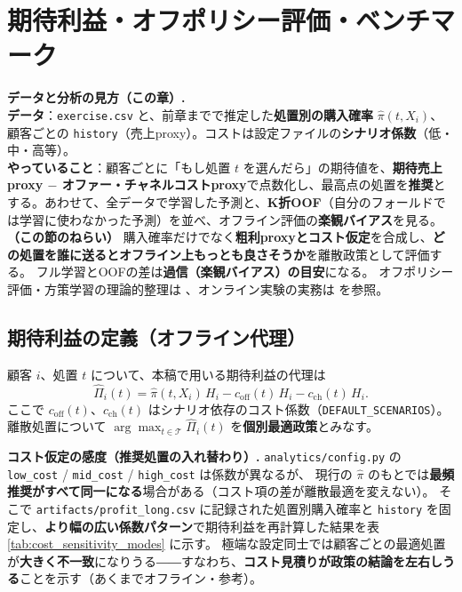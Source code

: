 \documentclass[11pt,a4paper]{article}
\newcommand{\pihat}{\hat{\pi}}
\newcommand{\Pihat}{\widehat{\Pi}}
\begin{document}
\FloatBarrier
\section{期待利益・オフポリシー評価・ベンチマーク}
\label{sec:opeval}

\noindent\textbf{データと分析の見方（この章）.}\\
\textbf{データ}：\texttt{exercise.csv} と、前章までで推定した\textbf{処置別の購入確率} $\pihat(t,X_i)$、顧客ごとの \texttt{history}（売上proxy）。コストは設定ファイルの\textbf{シナリオ係数}（低・中・高等）。\\
\textbf{やっていること}：顧客ごとに「もし処置 $t$ を選んだら」の期待値を、\textbf{期待売上proxy $-$ オファー・チャネルコストproxy}で点数化し、最高点の処置を\textbf{推奨}とする。あわせて、全データで学習した予測と、\textbf{K折OOF}（自分のフォールドでは学習に使わなかった予測）を並べ、オフライン評価の\textbf{楽観バイアス}を見る。\\

\noindent\textbf{（この節のねらい）}
購入確率だけでなく\textbf{粗利proxyとコスト仮定}を合成し、\textbf{どの処置を誰に送るとオフライン上もっとも良さそうか}を離散政策として評価する。
フル学習とOOFの差は\textbf{過信（楽観バイアス）の目安}になる。
オフポリシー評価・方策学習の理論的整理は \cite{Dudik2011}、オンライン実験の実務は \cite{Kohavi2020} を参照。

\FloatBarrier
\subsection{期待利益の定義（オフライン代理）}
顧客 $i$、処置 $t$ について、本稿で用いる期待利益の代理は
\begin{equation}
  \label{eq:profit}
  \Pihat_i(t)
  = \pihat(t, X_i)\, H_i
  - c_{\mathrm{off}}(t)\, H_i
  - c_{\mathrm{ch}}(t)\, H_i .
\end{equation}
ここで $c_{\mathrm{off}}(t)$、$c_{\mathrm{ch}}(t)$ はシナリオ依存のコスト係数（\texttt{DEFAULT\_SCENARIOS}）。
離散処置について $\arg\max_{t \in \mathcal{T}} \Pihat_i(t)$ を\textbf{個別最適政策}とみなす。

\medskip\noindent
\textbf{コスト仮定の感度（推奨処置の入れ替わり）.}
\texttt{analytics/config.py} の \texttt{low\_cost} / \texttt{mid\_cost} / \texttt{high\_cost} は係数が異なるが、
現行の $\pihat$ のもとでは\textbf{最頻推奨がすべて同一になる}場合がある（コスト項の差が離散最適を変えない）。
そこで \texttt{artifacts/profit\_long.csv} に記録された処置別購入確率と \texttt{history} を固定し、\textbf{より幅の広い係数パターン}で期待利益を再計算した結果を表 \ref{tab:cost_sensitivity_modes} に示す。
極端な設定同士では顧客ごとの最適処置が\textbf{大きく不一致}になりうる――すなわち、\textbf{コスト見積りが政策の結論を左右しうる}ことを示す（あくまでオフライン・参考）。
\end{document}
